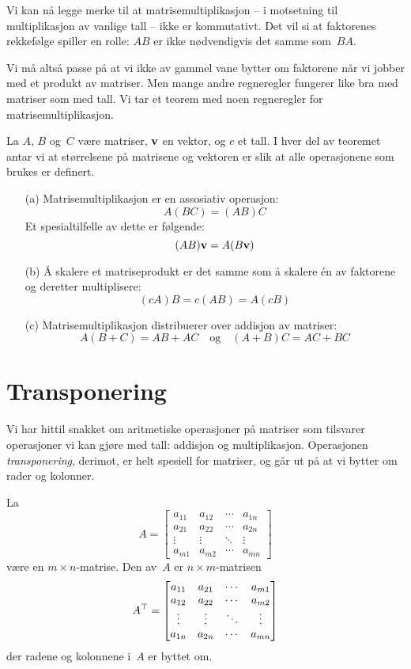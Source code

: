 Vi kan nå legge merke til at matrisemultiplikasjon -- i motsetning til
multiplikasjon av vanlige tall -- ikke er kommutativt.  Det vil si at
faktorenes rekkefølge spiller en rolle: $AB$ er ikke nødvendigvis det
samme som~$BA$.

Vi må altså passe på at vi ikke av gammel vane bytter om faktorene når
vi jobber med et produkt av matriser.  Men mange andre regneregler
fungerer like bra med matriser som med tall.  Vi tar et teorem med
noen regneregler for matrisemultiplikasjon.

\begin{thm}
La $A$, $B$ og~$C$ være matriser, $\mathbf{v}$ en vektor, og $c$ et tall.
I hver del av teoremet antar vi at størrelsene på matrisene og
vektoren er slik at alle operasjonene som brukes er definert.
\begin{enumerate}
\item[(a)]
Matrisemultiplikasjon er en assosiativ operasjon:
\[
A(BC) = (AB)C
\]
Et spesialtilfelle av dette er følgende:
\[
(AB) \mathbf{v} = A (B \mathbf{v})
\]
\item[(b)]
Å skalere et matriseprodukt er det samme som å skalere én av faktorene
og deretter multiplisere:
\[
(c A) B = c (AB) = A (cB)
\]
\item[(c)]
Matrisemultiplikasjon distribuerer over addisjon av matriser:
\[
A(B+C) = AB + AC
\quad\text{og}\quad
(A+B)C = AC + BC
\]
\end{enumerate}
\end{thm}





\section*{Transponering}

Vi har hittil snakket om aritmetiske operasjoner på matriser som
tilsvarer operasjoner vi kan gjøre med tall: addisjon og
multiplikasjon.  Operasjonen \emph{transponering}, derimot, er helt
spesiell for matriser, og går ut på at vi bytter om rader og kolonner.

\begin{defn}
La
\[
A =
\begin{bmatrix}
a_{11} & a_{12} & \cdots & a_{1n} \\
a_{21} & a_{22} & \cdots & a_{2n} \\
\vdots & \vdots & \ddots & \vdots \\
a_{m1} & a_{m2} & \cdots & a_{mn}
\end{bmatrix}
\]
være en $m \times n$-matrise.  Den  av~$A$ er
$n \times m$-matrisen
\[
A^\top =
\begin{bmatrix}
a_{11} & a_{21} & \cdots & a_{m1} \\
a_{12} & a_{22} & \cdots & a_{m2} \\
\vdots & \vdots & \ddots & \vdots \\
a_{1n} & a_{2n} & \cdots & a_{mn}
\end{bmatrix}
\]
der radene og kolonnene i~$A$ er byttet om.
\end{defn}

